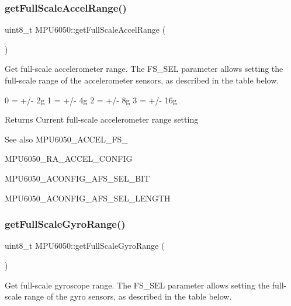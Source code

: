 \subsubsection{\texorpdfstring{getFullScaleAccelRange()}{getFullScaleAccelRange()}}
{\footnotesize\ttfamily uint8\+\_\+t M\+P\+U6050\+::get\+Full\+Scale\+Accel\+Range (\begin{DoxyParamCaption}{ }\end{DoxyParamCaption})}

Get full-\/scale accelerometer range. The F\+S\+\_\+\+S\+EL parameter allows setting the full-\/scale range of the accelerometer sensors, as described in the table below.


\begin{DoxyPre}
0 = +/- 2g
1 = +/- 4g
2 = +/- 8g
3 = +/- 16g
\end{DoxyPre}


\begin{DoxyReturn}{Returns}
Current full-\/scale accelerometer range setting 
\end{DoxyReturn}
\begin{DoxySeeAlso}{See also}
M\+P\+U6050\+\_\+\+A\+C\+C\+E\+L\+\_\+\+F\+S\+\_ 

M\+P\+U6050\+\_\+\+R\+A\+\_\+\+A\+C\+C\+E\+L\+\_\+\+C\+O\+N\+F\+IG 

M\+P\+U6050\+\_\+\+A\+C\+O\+N\+F\+I\+G\+\_\+\+A\+F\+S\+\_\+\+S\+E\+L\+\_\+\+B\+IT 

M\+P\+U6050\+\_\+\+A\+C\+O\+N\+F\+I\+G\+\_\+\+A\+F\+S\+\_\+\+S\+E\+L\+\_\+\+L\+E\+N\+G\+TH 
\end{DoxySeeAlso}
\mbox{\label{class_m_p_u6050_acb1fa088d43d76230106a3226f343013}} 
\subsubsection{\texorpdfstring{getFullScaleGyroRange()}{getFullScaleGyroRange()}}
{\footnotesize\ttfamily uint8\+\_\+t M\+P\+U6050\+::get\+Full\+Scale\+Gyro\+Range (\begin{DoxyParamCaption}{ }\end{DoxyParamCaption})}

Get full-\/scale gyroscope range. The F\+S\+\_\+\+S\+EL parameter allows setting the full-\/scale range of the gyro sensors, as described in the table below.


